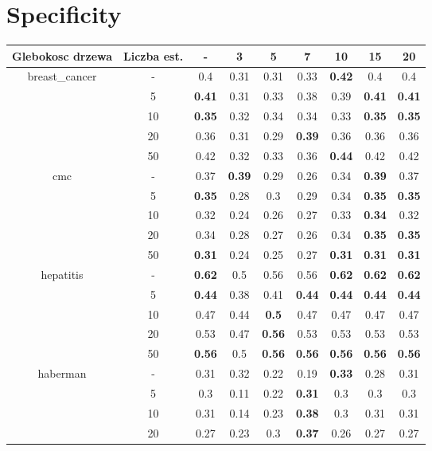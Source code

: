 \documentclass{article}%
\begin{document}
\section*{Specificity}%
\begin{tabular}{c|c|ccccccc}%
\hline%
Glebokosc drzewa&Liczba est.&{-}&3&5&7&10&15&20\\%
\hline%
\multirow{5}{*}{breast\_cancer}&{-}&0.4&0.31&0.31&0.33&\textbf{0.42}&0.4&0.4\\%
\cline{2%
-%
9}%
&5&\textbf{0.41}&0.31&0.33&0.38&0.39&\textbf{0.41}&\textbf{0.41}\\%
\cline{2%
-%
9}%
&10&\textbf{0.35}&0.32&0.34&0.34&0.33&\textbf{0.35}&\textbf{0.35}\\%
\cline{2%
-%
9}%
&20&0.36&0.31&0.29&\textbf{0.39}&0.36&0.36&0.36\\%
\cline{2%
-%
9}%
&50&0.42&0.32&0.33&0.36&\textbf{0.44}&0.42&0.42\\%
\hline%
\multirow{5}{*}{cmc}&{-}&0.37&\textbf{0.39}&0.29&0.26&0.34&\textbf{0.39}&0.37\\%
\cline{2%
-%
9}%
&5&\textbf{0.35}&0.28&0.3&0.29&0.34&\textbf{0.35}&\textbf{0.35}\\%
\cline{2%
-%
9}%
&10&0.32&0.24&0.26&0.27&0.33&\textbf{0.34}&0.32\\%
\cline{2%
-%
9}%
&20&0.34&0.28&0.27&0.26&0.34&\textbf{0.35}&\textbf{0.35}\\%
\cline{2%
-%
9}%
&50&\textbf{0.31}&0.24&0.25&0.27&\textbf{0.31}&\textbf{0.31}&\textbf{0.31}\\%
\hline%
\multirow{5}{*}{hepatitis}&{-}&\textbf{0.62}&0.5&0.56&0.56&\textbf{0.62}&\textbf{0.62}&\textbf{0.62}\\%
\cline{2%
-%
9}%
&5&\textbf{0.44}&0.38&0.41&\textbf{0.44}&\textbf{0.44}&\textbf{0.44}&\textbf{0.44}\\%
\cline{2%
-%
9}%
&10&0.47&0.44&\textbf{0.5}&0.47&0.47&0.47&0.47\\%
\cline{2%
-%
9}%
&20&0.53&0.47&\textbf{0.56}&0.53&0.53&0.53&0.53\\%
\cline{2%
-%
9}%
&50&\textbf{0.56}&0.5&\textbf{0.56}&\textbf{0.56}&\textbf{0.56}&\textbf{0.56}&\textbf{0.56}\\%
\hline%
\multirow{5}{*}{haberman}&{-}&0.31&0.32&0.22&0.19&\textbf{0.33}&0.28&0.31\\%
\cline{2%
-%
9}%
&5&0.3&0.11&0.22&\textbf{0.31}&0.3&0.3&0.3\\%
\cline{2%
-%
9}%
&10&0.31&0.14&0.23&\textbf{0.38}&0.3&0.31&0.31\\%
\cline{2%
-%
9}%
&20&0.27&0.23&0.3&\textbf{0.37}&0.26&0.27&0.27\\%

\end{tabular}
\end{document}
